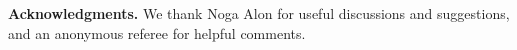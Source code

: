 \documentclass[11pt]{amsart}
\newtheorem{remark}[theorem]{Remark}
\numberwithin{equation}{section}
\newcommand{\todo}[1]{\vspace{5 mm}\par \noindent
\marginpar{\textsc{ToDo}} \framebox{\begin{minipage}[c]{0.95
\textwidth}
 #1 \end{minipage}}\vspace{5 mm}\par}
\begin{document}


\bigskip

\noindent
{\bf Acknowledgments.} 
We thank Noga Alon for useful discussions and suggestions, 
and an anonymous referee for helpful comments.  
\end{document}

